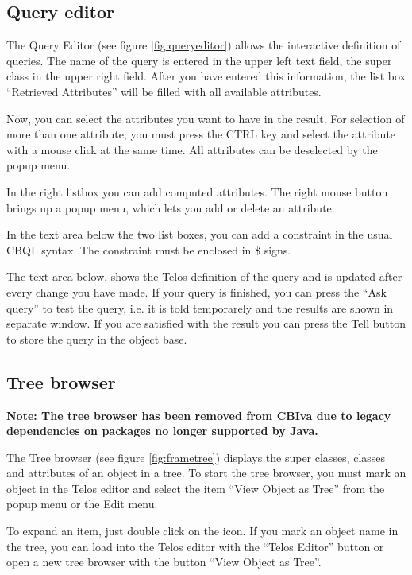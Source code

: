 \subsection{Query editor}
\label{sec:query_editor}

The Query Editor (see figure \ref{fig:queryeditor}) allows the interactive definition of queries.
The name of the query is entered in the upper left text field,
the super class in the upper right field. After you have entered
this information, the list box ``Retrieved Attributes'' will be
filled with all available attributes.

Now, you can select the attributes you want to have in the result.
For selection of more than one attribute, you must press the
CTRL key and select the attribute with a mouse click at the same time.
All attributes can be deselected by the popup menu.


In the right listbox you can add computed attributes. The right
mouse button brings up a popup menu, which lets you add or delete
an attribute.

In the text area below the two list boxes, you can add
a constraint in the usual CBQL syntax. The constraint must
be enclosed in \$ signs.

The text area below, shows the Telos definition of the query
and is updated after every change you have made. If your query is
finished, you can press the ``Ask query'' to test the query,
i.e. it is told temporarely and the results are shown in separate
window. If you are satisfied with the result you can press the Tell
button to store the query in the object base.

\subsection{Tree browser}
\label{sec:tree_browser}

{\bf Note: The tree browser has been removed from CBIva due to legacy dependencies on
packages no longer supported by Java.}

The Tree browser (see figure \ref{fig:frametree}) displays the super classes, classes and
attributes of an object in a tree. To start the tree browser,
you must mark an object in the Telos editor and select the
item ``View Object as Tree'' from the popup menu or the Edit
menu.


To expand an item, just double click on the icon. If you mark an object
name in the tree, you can load into the Telos editor with the
``Telos Editor'' button or open a new tree browser with the
button ``View Object as Tree''.


